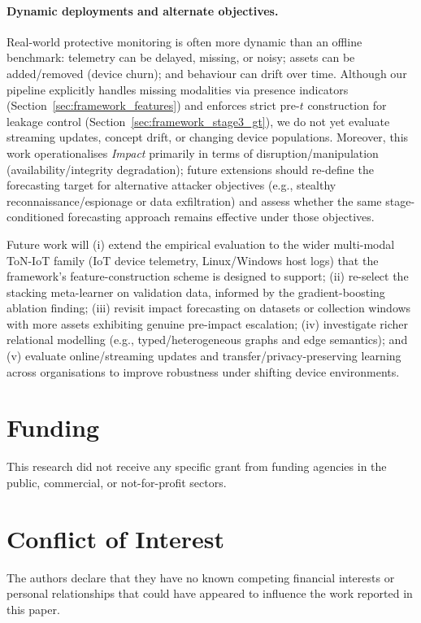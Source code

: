 \documentclass[pdflatex,sn-mathphys-num]{sn-jnl}
\theoremstyle{thmstyleone}%
\theoremstyle{thmstyletwo}%
\theoremstyle{thmstylethree}%
\begin{document}
\paragraph{Dynamic deployments and alternate objectives.}
Real-world protective monitoring is often more dynamic than an offline benchmark: telemetry can be delayed, missing, or noisy; assets can be added/removed (device churn); and behaviour can drift over time. Although our pipeline explicitly handles missing modalities via presence indicators (Section~\ref{sec:framework_features}) and enforces strict pre-$t$ construction for leakage control (Section~\ref{sec:framework_stage3_gt}), we do not yet evaluate streaming updates, concept drift, or changing device populations. Moreover, this work operationalises \emph{Impact} primarily in terms of disruption/manipulation (availability/integrity degradation); future extensions should re-define the forecasting target for alternative attacker objectives (e.g., stealthy reconnaissance/espionage or data exfiltration) and assess whether the same stage-conditioned forecasting approach remains effective under those objectives.

Future work will (i) extend the empirical evaluation to the wider multi-modal ToN-IoT family (IoT device telemetry, Linux/Windows host logs) that the framework's feature-construction scheme is designed to support; (ii) re-select the stacking meta-learner on validation data, informed by the gradient-boosting ablation finding; (iii) revisit impact forecasting on datasets or collection windows with more assets exhibiting genuine pre-impact escalation; (iv) investigate richer relational modelling (e.g., typed/heterogeneous graphs and edge semantics); and (v) evaluate online/streaming updates and transfer/privacy-preserving learning across organisations to improve robustness under shifting device environments.

\section{Funding}
This research did not receive any specific grant from funding agencies in the public, commercial, or not-for-profit sectors.

\section{Conflict of Interest}
The authors declare that they have no known competing financial interests or personal relationships that could have appeared to influence the work reported in this paper.

\end{document}
